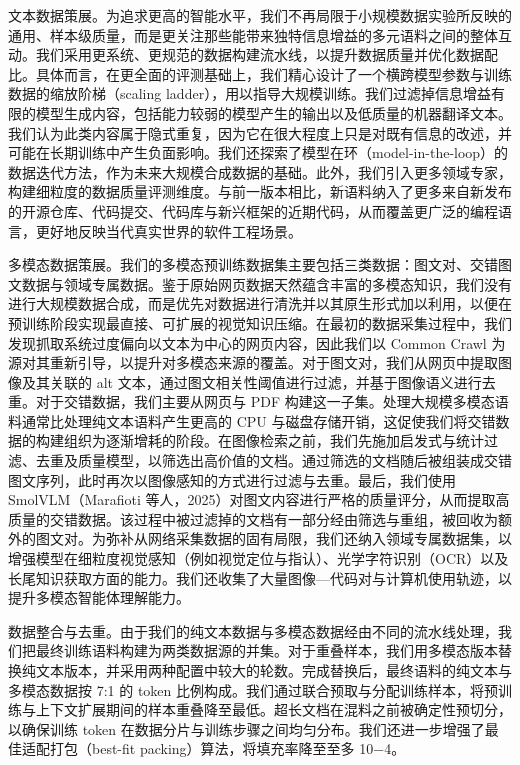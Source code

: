 \documentclass[
  10
]{article}
\begin{document}
文本数据策展。为追求更高的智能水平，我们不再局限于小规模数据实验所反映的通用、样本级质量，而是更关注那些能带来独特信息增益的多元语料之间的整体互动。我们采用更系统、更规范的数据构建流水线，以提升数据质量并优化数据配比。具体而言，在更全面的评测基础上，我们精心设计了一个横跨模型参数与训练数据的缩放阶梯（scaling ladder），用以指导大规模训练。我们过滤掉信息增益有限的模型生成内容，包括能力较弱的模型产生的输出以及低质量的机器翻译文本。我们认为此类内容属于隐式重复，因为它在很大程度上只是对既有信息的改述，并可能在长期训练中产生负面影响。我们还探索了模型在环（model-in-the-loop）的数据迭代方法，作为未来大规模合成数据的基础。此外，我们引入更多领域专家，构建细粒度的数据质量评测维度。与前一版本相比，新语料纳入了更多来自新发布的开源仓库、代码提交、代码库与新兴框架的近期代码，从而覆盖更广泛的编程语言，更好地反映当代真实世界的软件工程场景。



多模态数据策展。我们的多模态预训练数据集主要包括三类数据：图文对、交错图文数据与领域专属数据。鉴于原始网页数据天然蕴含丰富的多模态知识，我们没有进行大规模数据合成，而是优先对数据进行清洗并以其原生形式加以利用，以便在预训练阶段实现最直接、可扩展的视觉知识压缩。在最初的数据采集过程中，我们发现抓取系统过度偏向以文本为中心的网页内容，因此我们以 Common Crawl 为源对其重新引导，以提升对多模态来源的覆盖。对于图文对，我们从网页中提取图像及其关联的 alt 文本，通过图文相关性阈值进行过滤，并基于图像语义进行去重。对于交错数据，我们主要从网页与 PDF 构建这一子集。处理大规模多模态语料通常比处理纯文本语料产生更高的 CPU 与磁盘存储开销，这促使我们将交错数据的构建组织为逐渐增耗的阶段。在图像检索之前，我们先施加启发式与统计过滤、去重及质量模型，以筛选出高价值的文档。通过筛选的文档随后被组装成交错图文序列，此时再次以图像感知的方式进行过滤与去重。最后，我们使用 SmolVLM（Marafioti 等人，2025）对图文内容进行严格的质量评分，从而提取高质量的交错数据。该过程中被过滤掉的文档有一部分经由筛选与重组，被回收为额外的图文对。为弥补从网络采集数据的固有局限，我们还纳入领域专属数据集，以增强模型在细粒度视觉感知（例如视觉定位与指认）、光学字符识别（OCR）以及长尾知识获取方面的能力。我们还收集了大量图像—代码对与计算机使用轨迹，以提升多模态智能体理解能力。

数据整合与去重。由于我们的纯文本数据与多模态数据经由不同的流水线处理，我们把最终训练语料构建为两类数据源的并集。对于重叠样本，我们用多模态版本替换纯文本版本，并采用两种配置中较大的轮数。完成替换后，最终语料的纯文本与多模态数据按 7:1 的 token 比例构成。我们通过联合预取与分配训练样本，将预训练与上下文扩展期间的样本重叠降至最低。超长文档在混料之前被确定性预切分，以确保训练 token 在数据分片与训练步骤之间均匀分布。我们还进一步增强了最佳适配打包（best-fit packing）算法，将填充率降至至多 10−4。
\end{document}
